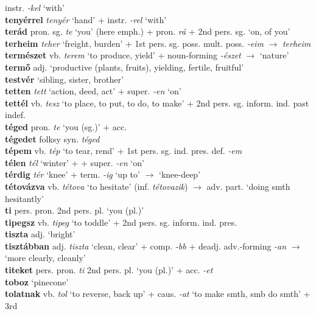 \documentclass[11pt]{article}
\begin{document}
instr. \emph{-kel} `with' \\
\textbf{tenyérrel} \emph{tenyér} `hand' + instr. \emph{-rel} `with' \\
\textbf{terád} pron. sg. \emph{te} `you' (here emph.) +
pron. \emph{rá} + 2nd pers. sg. `on, of you' \\
\textbf{terheim} \emph{teher} `freight, burden' + 1st
pers. sg. poss. mult. poss. \emph{-eim}
$\rightarrow$ \emph{terheim} \\
\textbf{természet} vb. \emph{terem} `to produce, yield' +
noun\hyp{}forming \emph{-észet} $\rightarrow$ `nature' \\
\textbf{termő} adj. `productive (plants, fruits), yielding, fertile,
fruitful' \\
\textbf{testvér} `sibling, sister, brother' \\
\textbf{tetten} \emph{tett} `action, deed, act' +
super. \emph{-en} `on' \\
\textbf{tettél} vb. \emph{tesz} `to place, to put, to do, to make' + 2nd
pers. sg. inform. ind. past indef. \\
\textbf{téged} pron. \emph{te} `you (sg.)' + acc. \\
\textbf{tégedet} folksy syn. \emph{téged} \\
\textbf{tépem} vb. \emph{tép} `to tear, rend' + 1st
pers. sg. ind. pres. def. \emph{-em} \\
\textbf{télen} \emph{tél} `winter' + + super. \emph{-en} `on' \\
\textbf{térdig} \emph{tér} `knee' + term. \emph{-ig} `up to'
$\rightarrow$ `knee\hyp{}deep' \\
\textbf{tétovázva} vb. \emph{tétova} `to hesitate'
(inf. \emph{tétovazik}) $\rightarrow$ adv. part. `doing smth
hesitantly' \\
\textbf{ti} pers. pron. 2nd pers. pl. `you (pl.)' \\
\textbf{tipegsz} vb. \emph{tipeg} `to toddle' + 2nd
pers. sg. inform. ind. pres. \\
\textbf{tiszta} adj. `bright' \\
\textbf{tisztábban} adj. \emph{tiszta} `clean, clear' +
comp. \emph{-bb} + deadj. adv.\hyp{}forming \emph{-an} $\rightarrow$
`more clearly, cleanly' \\
\textbf{titeket} pers. pron. \emph{ti} 2nd pers. pl. `you (pl.)' +
acc. \emph{-et} \\
\textbf{toboz} `pinecone' \\
\textbf{tolatnak} vb. \emph{tol} `to reverse, back up' +
caus. \emph{-at} `to make smth, smb do smth' + 3rd
\end{document}
